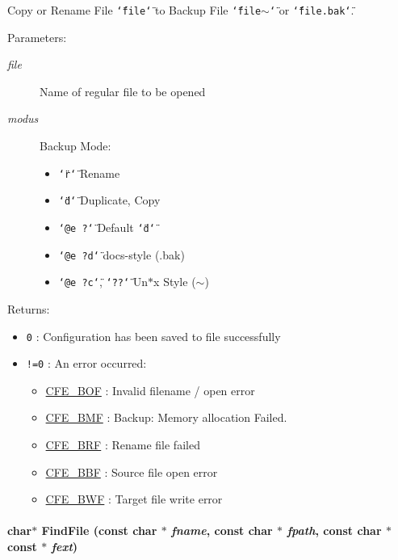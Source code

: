 Copy or Rename File {\tt \char`\"{}file\char`\"{}} to Backup File {\tt \char`\"{}file$\sim$\char`\"{}} or {\tt \char`\"{}file.bak\char`\"{}}. 

\begin{Desc}
\item[Parameters:]
\begin{description}
\item[{\em file}]Name of regular file to be opened \item[{\em modus}]Backup Mode: \begin{itemize}
\item {\tt \char`\"{}r\char`\"{}} Rename \item {\tt \char`\"{}d\char`\"{}} Duplicate, Copy \item {\tt \char`\"{}@e ?\char`\"{}} Default {\tt \char`\"{}d\char`\"{}} \item {\tt \char`\"{}@e ?d\char`\"{}} docs-style ({\tt }.bak) \item {\tt \char`\"{}@e ?c\char`\"{}}, {\tt \char`\"{}??\char`\"{}} Un$\ast$x Style ({\tt $\sim$})\end{itemize}
\end{description}
\end{Desc}
\begin{Desc}
\item[Returns:]\begin{itemize}
\item {\tt 0} : Configuration has been saved to file successfully\end{itemize}
\begin{itemize}
\item {\tt !=0} : An error occurred:\begin{itemize}
\item \hyperlink{group__errors_gda14f93a466c819b6286bcf7f85bbbe5}{CFE\_\-BOF} : Invalid filename / open error\item \hyperlink{group__errors_g722db0752b9a2f977065b8001da18101}{CFE\_\-BMF} : Backup: Memory allocation Failed. \item \hyperlink{group__errors_gee4caa017da2daf88aa192647f5ebaba}{CFE\_\-BRF} : Rename file failed\item \hyperlink{group__errors_g793b92e4f9ea3a7acde0cc0dcf80701f}{CFE\_\-BBF} : Source file open error\item \hyperlink{group__errors_g58992d0fae72c0a93a8fb1ec9cc1cd9c}{CFE\_\-BWF} : Target file write error \end{itemize}
\end{itemize}
\end{Desc}
\hypertarget{group__utilities_g4e4e8f9a03b7f3598b5efd199b9a67c9}{
\paragraph[{FindFile}]{\setlength{\rightskip}{0pt plus 5cm}char$\ast$ FindFile (const char $\ast$ {\em fname}, \/  const char $\ast$ {\em fpath}, \/  const char $\ast$const $\ast$ {\em fext})}\hfill}
\label{group__utilities_g4e4e8f9a03b7f3598b5efd199b9a67c9}


